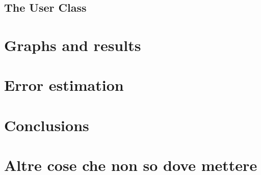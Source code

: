 \documentclass[11pt,a4paper]{article}
\begin{document}
\subsection{The User Class}
	





\section{Graphs and results}

\section{Error estimation}

\section{Conclusions}

\section{Altre cose che non so dove mettere}


\begin{comment}

\begin{center}
\texttt{[image: exe1\_smd.pdf]}
\end{center}
\newpage 

\end{comment}
\end{document}
